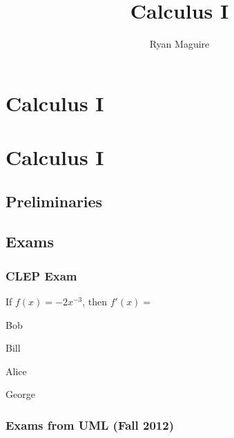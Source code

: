 \documentclass[crop=false,class=book,oneside]{standalone}
\begin{document}
    \ifx\ifmathcourses\undefined
        \title{Calculus I}
        \author{Ryan Maguire}
        \date{\vspace{-5ex}}
        \maketitle
        \tableofcontents
        \chapter*{Calculus I}
        \setcounter{chapter}{1}
    \else
        \chapter{Calculus I}
    \fi
    \section{Preliminaries}
        
    \section{Exams}
    \subsection{CLEP Exam}
        \begin{problem}
            If $f(x)=-2x^{-3}$, then $f'(x)=$
            \begin{enumerate}[label=(\Alph*)]
                \begin{multicols}{4}
                    \item Bob
                    \item Bill
                    \item Alice
                    \item George
                \end{multicols}
            \end{enumerate}
        \end{problem}
    \subsection{Exams from UML (Fall 2012)}
\end{document}
